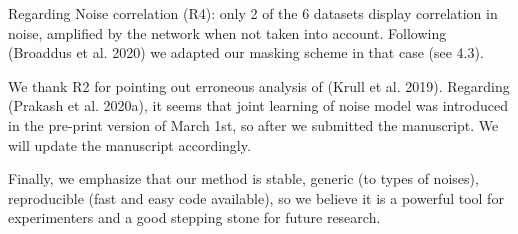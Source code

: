 \documentclass{article}
\begin{document}
Regarding Noise correlation (R4): only 2 of the 6 datasets display correlation in noise, amplified by the network when not taken into account.
Following (Broaddus et al. 2020) we adapted our masking scheme in that case (see 4.3).

We thank R2 for pointing out erroneous analysis of (Krull et al. 2019). Regarding (Prakash et al. 2020a), it seems that joint learning of noise model was introduced in the pre-print version of March 1st, so after we submitted the manuscript. We will update the manuscript accordingly.

Finally, we emphasize that our method is stable, generic (to types of noises), reproducible (fast and easy code available), so we believe it is a powerful tool for experimenters and a good stepping stone for future research.

\end{document}
